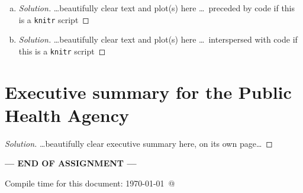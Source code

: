 \documentclass[12pt]{article}\usepackage[]{graphicx}\usepackage[]{color}
\makeatletter
\newenvironment{kframe}{%
 \def\at@end@of@kframe{}%
 \ifinner\ifhmode%
  \def\at@end@of@kframe{\end{minipage}}%
  \begin{minipage}{\columnwidth}%
 \fi\fi%
 \def\FrameCommand##1{\hskip\@totalleftmargin \hskip-\fboxsep
 \colorbox{shadecolor}{##1}\hskip-\fboxsep
     \hskip-\linewidth \hskip-\@totalleftmargin \hskip\columnwidth}%
 \MakeFramed {\advance\hsize-\width
   \@totalleftmargin\z@ \linewidth\hsize
   \@setminipage}}%
 {\par\unskip\endMakeFramed%
 \at@end@of@kframe}
\newenvironment{knitrout}{}{} %
\makeatother
\begin{document}
\begin{enumerate}[(a)]
\begin{itemize}
\begin{knitrout}
\begin{kframe}
{\ttfamily\noindent\bfseries{}}\end{kframe}
\end{knitrout}


  \end{itemize}

 {\color{blue} \begin{proof}[Solution]
 {\color{magenta}\dots If this is a \texttt{knitr} script then your code should be displayed here.  Otherwise, you should state here the name of the file where the \Rlogo code is, and the names of any functions you defined\dots}
 \end{proof}
 }

\item \FitSIRc

  {\color{blue} \begin{proof}[Solution]
  {\color{magenta}\dots beautifully clear text and plot(s) here \dots\ preceded by \Rlogo code if this is a \texttt{knitr} script}
  \end{proof}
  }

\item \FitSIRd

  {\color{blue} \begin{proof}[Solution]
  {\color{magenta}\dots beautifully clear text and plot(s) here \dots\ interspersed with \Rlogo code if this is a \texttt{knitr} script}
  \end{proof}
  }

\end{enumerate}

\section{Executive summary for the Public Health Agency}

\ExecSumm

  {\color{blue} \begin{proof}[Solution]
  {\color{magenta}\dots beautifully clear executive summary here, on its own page\dots}
  \end{proof}
  }

\bigskip

\centerline{\bf--- END OF ASSIGNMENT ---}

\bigskip
Compile time for this document:
\today\ @ \thistime
\end{document}
